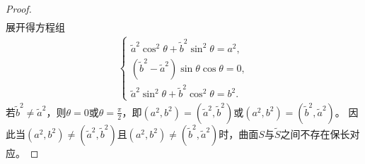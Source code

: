 \documentclass[../../main.tex]{subfiles}%
\begin{document}
\begin{proof}
\begin{align*}
\end{align*}
展开得方程组
\begin{align*}
\begin{cases}
\tilde{a}^2\cos^2\theta+\tilde{b}^2\sin^2\theta=a^2,\\
(\tilde{b}^2-\tilde{a}^2)\sin\theta\cos\theta=0,\\
\tilde{a}^2\sin^2\theta+\tilde{b}^2\cos^2\theta=b^2.
\end{cases}
\end{align*}
若$\tilde{b}^2\neq\tilde{a}^2$，则$\theta=0$或$\theta=\frac{\pi}{2}$，即$(a^2,b^2)=(\tilde{a}^2,\tilde{b}^2)$或$(a^2,b^2)=(\tilde{b}^2,\tilde{a}^2)$。
因此当$(a^2,b^2)\neq(\tilde{a}^2,\tilde{b}^2)$且$(a^2,b^2)\neq(\tilde{b}^2,\tilde{a}^2)$时，曲面$S$与$\tilde{S}$之间不存在保长对应。
\end{proof}
\end{document}
